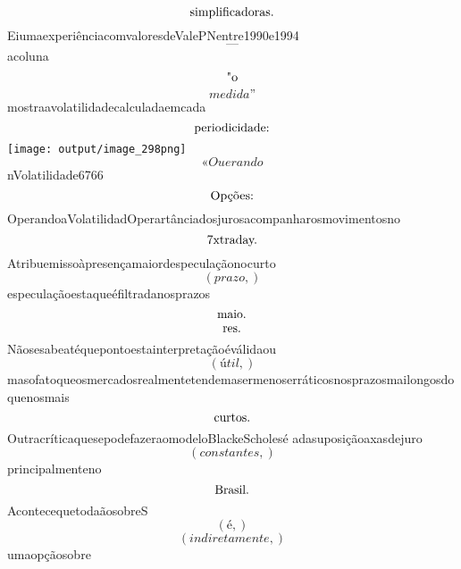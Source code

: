 \documentclass{article}
\begin{document}
\begin{equation}
$simplificadoras.$
\end{equation}EiumaexperiênciacomvaloresdeValePNentre1990e1994\begin{equation}
—
\end{equation}acoluna\begin{equation}
$"o$
\end{equation}\begin{equation}
medida”
\end{equation}mostraavolatilidadecalculadaemcada\begin{equation}
$periodicidade:$
\end{equation}\texttt{[image: output/image\_298png]}\begin{equation}
«Ouerando
\end{equation}nVolatilidade6766\begin{equation}
$Opções:$
\end{equation}OperandoaVolatilidadOperartânciadosjurosacompanharosmovimentosno\begin{equation}
$7xtraday.$
\end{equation}Atribuemissoàpresençamaiordespeculaçãonocurto\begin{equation}
\left( prazo,\right)
\end{equation}especulaçãoestaqueéfiltradanosprazos\begin{equation}
$maio.$
\end{equation}\begin{equation}
$res.$
\end{equation}Nãosesabeatéquepontoestainterpretaçãoéválidaou\begin{equation}
\left( útil,\right)
\end{equation}masofatoqueosmercadosrealmentetendemasermenoserráticosnosprazosmailongosdoquenosmais\begin{equation}
$curtos.$
\end{equation}OutracríticaquesepodefazeraomodeloBlackeScholesé adasuposiçãoaxasdejuro\begin{equation}
\left( constantes,\right)
\end{equation}principalmenteno\begin{equation}
$Brasil.$
\end{equation}AcontecequetodaãosobreS\begin{equation}
\left( é,\right)
\end{equation}\begin{equation}
\left( indiretamente,\right)
\end{equation}umaopçãosobre\begin{equation}

\end{equation}
\end{document}
